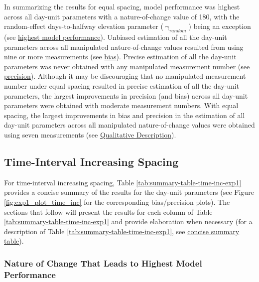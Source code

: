 \documentclass[
12pt, %
twoside,
english]{guelphthesis}
\begin{document}
In summarizing the results for equal spacing, model performance was highest across all day-unit parameters with a nature-of-change value of 180, with the random-effect days-to-halfway elevation parameter (\(\upgamma_{random}\)) being an exception (see \protect\hyperlink{nature-change-equal-exp1}{highest model performance}). Unbiased estimation of all the day-unit parameters across all manipulated nature-of-change values resulted from using nine or more measurements (see \protect\hyperlink{bias-equal-exp1}{bias}). Precise estimation of all the day-unit parameters was never obtained with any manipulated measurement number (see \protect\hyperlink{precision-equal-exp1}{precision}). Although it may be discouraging that no manipulated measurement number under equal spacing resulted in precise estimation of all the day-unit parameters, the largest improvements in precision (and bias) across all day-unit parameters were obtained with moderate measurement numbers. With equal spacing, the largest improvements in bias and precision in the estimation of all day-unit parameters across all manipulated nature-of-change values were obtained using seven measurements (see \protect\hyperlink{qualitative-equal-exp1}{Qualitative Description}).

\hypertarget{time-interval-increasing-spacing}{%
\subsection{Time-Interval Increasing Spacing}\label{time-interval-increasing-spacing}}

For time-interval increasing spacing, Table \ref{tab:summary-table-time-inc-exp1} provides a concise summary of the results for the day-unit parameters (see Figure \ref{fig:exp1_plot_time_inc} for the corresponding bias/precision plots). The sections that follow will present the results for each column of Table \ref{tab:summary-table-time-inc-exp1} and provide elaboration when necessary (for a description of Table \ref{tab:summary-table-time-inc-exp1}, see \protect\hyperlink{concise-tab}{concise summary table}).

\hypertarget{nature-change-time-inc-exp1}{%
\subsubsection{Nature of Change That Leads to Highest Model Performance}\label{nature-change-time-inc-exp1}}
\end{document}
